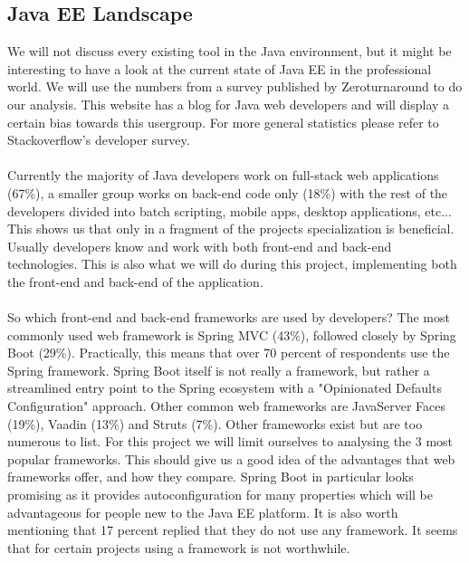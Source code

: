 \documentclass[12pt]{article}
\begin{document}
\begin{multicols}{2}
\subsection{Java EE Landscape}
We will not discuss every existing tool in the Java environment, but it might be interesting to have a look at the current state of Java EE in the professional world. We will use the numbers from a survey published by Zeroturnaround to do our analysis.\cite{JavaEELandscape73:online} This website has a blog for Java web developers and will display a certain bias towards this usergroup. For more general statistics please refer to Stackoverflow's developer survey.\cite{DeveloperSurvey95:online}
\\\\
Currently the majority of Java developers work on full-stack web applications (67\%), a smaller group works on back-end code only (18\%) with the rest of the developers divided into batch scripting, mobile apps, desktop applications, etc... This shows us that only in a fragment of the projects specialization is beneficial. Usually developers know and work with both front-end and back-end technologies. This is also what we will do during this project, implementing both the front-end and back-end of the application.
\\\\
So which front-end and back-end frameworks are used by developers? The most commonly used web framework is Spring MVC (43\%), followed closely by Spring Boot (29\%). Practically, this means that over 70 percent of respondents use the Spring framework. Spring Boot itself is not really a framework, but rather a streamlined entry point to the Spring ecosystem with a "Opinionated Defaults Configuration" approach. \cite{SpringBootAdvantages67:online}\cite{SpringBootIntro23:online} Other common web frameworks are JavaServer Faces (19\%), Vaadin (13\%) and Struts (7\%). Other frameworks exist but are too numerous to list. For this project we will limit ourselves to analysing the 3 most popular frameworks. This should give us a good idea of the advantages that web frameworks offer, and how they compare. Spring Boot in particular looks promising as it provides autoconfiguration for many properties which will be advantageous for people new to the Java EE platform. It is also worth mentioning that 17 percent replied that they do not use any framework. It seems that for certain projects using a framework is not worthwhile. %
\\\\

\end{multicols}
\end{document}
